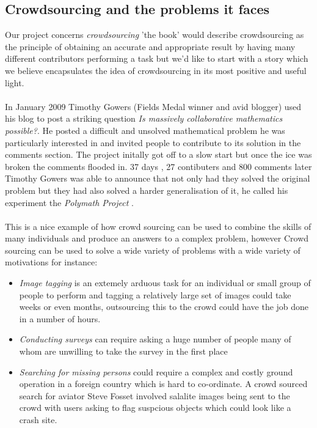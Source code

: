 \documentclass[11pt]{article}
\begin{document}
\subsection{Crowdsourcing and the problems it faces}
Our project concerns \emph{crowdsourcing} 'the book' would describe crowdsourcing as the principle of obtaining an accurate 
and appropriate result by having many different contributors performing a task but we'd like to start with a story which
we believe encapsulates the idea of crowdsourcing in its most positive and useful light.
\\
\\
In January 2009 Timothy Gowers (Fields Medal winner and avid blogger) used his blog to post a striking question \emph{Is massively 
collaborative mathematics possible?}. He posted a difficult and unsolved mathematical problem he was particularly interested in and invited 
people to contribute to its solution in the comments section. The project initally got off to a slow start but once the ice was broken the 
comments flooded in. 37 days , 27 contibuters and 800 comments later Timothy Gowers was able to announce that not only had they solved the 
original problem but they had also solved a harder generalisation of it, he called his experiment the \emph{Polymath Project} .
\\
\\
This is a nice example of how crowd sourcing can be used to combine the skills of many individuals and produce an answers to a complex problem,
however Crowd sourcing can be used to solve a wide variety of problems with a wide variety of motivations for instance:
\begin{itemize}
\item 
\emph{Image tagging} is an extemely arduous task for an individual or small group of people to perform and tagging a relatively large 
set of images could take weeks or even months, outsourcing this to the crowd could have the job done in a number of hours.
\item
\emph{Conducting surveys} can require asking a huge number of people many of whom are unwilling to take the survey in the first place
\item
\emph{Searching for missing persons} could require a complex and costly ground operation in a foreign country which is hard
to co-ordinate. A crowd sourced search for aviator Steve Fosset involved salalite images being sent to the crowd with
users asking to flag suspcious objects which could look like a crash site.
\end{itemize}
\end{document}
